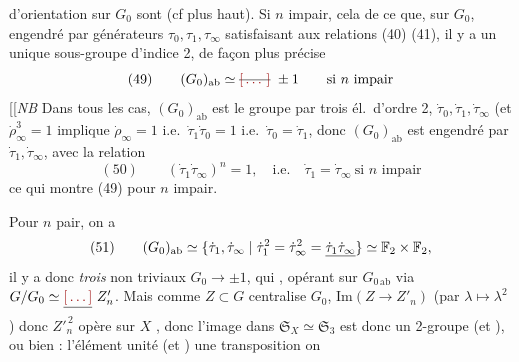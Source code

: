 \documentclass[11pt,a4paper]{article}
\begin{document}
d'orientation \struck{\ill{}}   sur $G_0$ sont  (cf plus haut). Si $n$ impair, cela  de ce que, sur $G_0$, engendré par  \struck{\ill{}} générateurs $\tau_0, \tau_1, \tau_\infty$ satisfaisant aux relations (40) (41), il y a \struck{\ill{}} \add{\ill{}} un unique sous-groupe d'indice 2, de façon plus précise
\[
(49) \qquad (G_0)_{\mathrm{ab}} \simeq \text{\struck{\ill{}}}\ \pm 1 \qquad \text{si } n \text{ impair}
\]
[[\emph{NB} Dans tous les cas, $(G_0)_{\mathrm{ab}}$ est \struck{\ill{}} le groupe  par  trois él.\ d'ordre 2, $\dot\tau_0, \dot\tau_1, \dot\tau_\infty$ (et $\dot\rho_\infty^{3} = 1$ \struck{\ill{}} implique $\dot\rho_\infty = 1$ i.e.\ $\dot\tau_1 \dot\tau_0 = 1$ i.e.\ $\dot\tau_0 = \dot\tau_1$, donc $(G_0)_{\mathrm{ab}}$ est engendré par $\dot\tau_1, \dot\tau_\infty$, avec la relation
\[
(50) \qquad (\dot\tau_1 \dot\tau_\infty)^{n} = 1, \quad \text{i.e.} \quad \dot\tau_1 = \dot\tau_\infty \ \text{si } n \text{ impair}
\]
ce qui montre (49) pour $n$ impair.

Pour $n$ pair, on a
\[
(51) \qquad (G_0)_{\mathrm{ab}} \simeq \{\dot\tau_1, \dot\tau_\infty \mid \dot\tau_1^{2} = \dot\tau_\infty^{2} = \uncertain{\dot\tau_1 \dot\tau_\infty}\} \simeq \mathbb{F}_2 \times \mathbb{F}_2 ,
\]
il y a donc  \emph{trois}  \struck{\ill{}} non triviaux $G_0 \to \pm 1$, qui \struck{\ill{}}   , opérant sur $G_{0\,\mathrm{ab}}$ via $G/G_0 \simeq \struck{\ill{}}\ Z'_n$. Mais comme $Z \subset G$ centralise $G_0$, $\mathrm{Im}(Z \to Z'_n)$  (par $\lambda \mapsto \lambda^2$) donc $Z'^{\,2}_n$ opère sur $X$ , donc l'image dans $\mathfrak{S}_X \simeq \mathfrak{S}_3$  \struck{\ill{}} est donc un 2-groupe    (et \ill{}), ou bien : l'élément unité (et \ill{}) \struck{\ill{}} une transposition   on 
\end{document}
